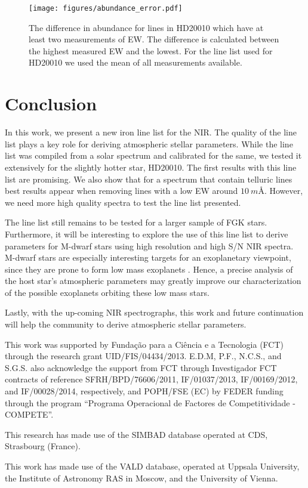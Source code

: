 \documentclass{aa}
\begin{document}
\begin{figure}[tpb!]
    \centering
    \texttt{[image: figures/abundance\_error.pdf]}
    \caption{The difference in abundance for lines in HD20010 which have at
    least two measurements of EW. The difference is calculated between the
    highest measured EW and the lowest. For the line list used for HD20010
    we used the mean of all measurements available.}
\end{figure}


\section{Conclusion}
\label{sec:conclusion}

In this work, we present a new iron line list for the NIR. The quality
of the line list plays a key role for deriving atmospheric stellar
parameters. While the line list was compiled from a solar spectrum and
calibrated for the same, we tested it extensively for the slightly
hotter star, HD20010. The first results with this line list are
promising. We also show that for a spectrum that contain telluric
lines best results appear when removing lines with a low EW around
$\SI{10}{m\angstrom}$. However, we need more high quality spectra
to test the line list presented.

The line list still remains to be tested for a larger sample of FGK
stars. Furthermore, it will be interesting to explore the use of this
line list to derive parameters for M-dwarf stars using high resolution
and high S/N NIR spectra. M-dwarf stars are especially interesting
targets for an exoplanetary viewpoint, since they are prone to form
low mass exoplanets \citep{Bonfils2013}. Hence, a precise analysis
of the host star's atmospheric parameters may greatly improve our
characterization of the possible exoplanets orbiting these low mass
stars.

Lastly, with the up-coming NIR spectrographs, this work and future
continuation will help the community to derive atmospheric stellar
parameters.





\begin{acknowledgements}

This work was supported by Funda\c{c}\~ao para a Ci\^encia e a
Tecnologia (FCT) through the research grant UID/FIS/04434/2013.
E.D.M, P.F., N.C.S., and S.G.S. also acknowledge the support from FCT
through Investigador FCT contracts of reference SFRH/BPD/76606/2011,
IF/01037/2013, IF/00169/2012, and IF/00028/2014, respectively, and
POPH/FSE (EC) by FEDER funding through the program “Programa
Operacional de Factores de Competitividade - COMPETE”.

This research has made use of the SIMBAD database operated at CDS,
Strasbourg (France).

This work has made use of the VALD database, operated at Uppsala
University, the Institute of Astronomy RAS in Moscow, and the University
of Vienna.

\end{acknowledgements}








\end{document}
